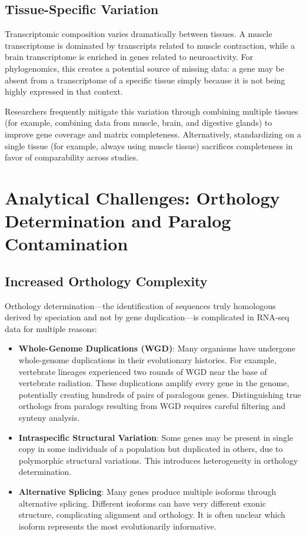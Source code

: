 \subsection{Tissue-Specific Variation}

Transcriptomic composition varies dramatically between tissues. A muscle transcriptome is dominated by transcripts related to muscle contraction, while a brain transcriptome is enriched in genes related to neuroactivity. For phylogenomics, this creates a potential source of missing data: a gene may be absent from a transcriptome of a specific tissue simply because it is not being highly expressed in that context.

Researchers frequently mitigate this variation through combining multiple tissues (for example, combining data from muscle, brain, and digestive glands) to improve gene coverage and matrix completeness. Alternatively, standardizing on a single tissue (for example, always using muscle tissue) sacrifices completeness in favor of comparability across studies.

\section{Analytical Challenges: Orthology Determination and Paralog Contamination}

\subsection{Increased Orthology Complexity}

Orthology determination---the identification of sequences truly homologous derived by speciation and not by gene duplication---is complicated in RNA-seq data for multiple reasons:

\begin{itemize}
\item \textbf{Whole-Genome Duplications (WGD)}: Many organisms have undergone whole-genome duplications in their evolutionary histories. For example, vertebrate lineages experienced two rounds of WGD near the base of vertebrate radiation. These duplications amplify every gene in the genome, potentially creating hundreds of pairs of paralogous genes. Distinguishing true orthologs from paralogs resulting from WGD requires careful filtering and synteny analysis.

\item \textbf{Intraspecific Structural Variation}: Some genes may be present in single copy in some individuals of a population but duplicated in others, due to polymorphic structural variations. This introduces heterogeneity in orthology determination.

\item \textbf{Alternative Splicing}: Many genes produce multiple isoforms through alternative splicing. Different isoforms can have very different exonic structure, complicating alignment and orthology. It is often unclear which isoform represents the most evolutionarily informative.
\end{itemize}


